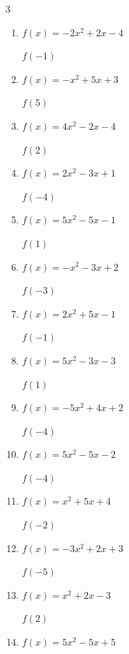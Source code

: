 \begin{multicols}{3}
\begin{enumerate}
$f(-5)$
        \phantom{$= -82$}

  \item $f(x)=-2x^{2}+2x-4$

$f(-1)$
        \phantom{$= -8$}

  \item $f(x)=-x^{2}+5x+3$

$f(5)$
        \phantom{$= 3$}

  \item $f(x)=4x^{2}-2x-4$

$f(2)$
        \phantom{$= 8$}

  \item $f(x)=2x^{2}-3x+1$

$f(-4)$
        \phantom{$= 45$}

  \item $f(x)=5x^{2}-5x-1$

$f(1)$
        \phantom{$= -1$}

  \item $f(x)=-x^{2}-3x+2$

$f(-3)$
        \phantom{$= 2$}

  \item $f(x)=2x^{2}+5x-1$

$f(-1)$
        \phantom{$= -4$}

  \item $f(x)=5x^{2}-3x-3$

$f(1)$
        \phantom{$= -1$}

  \item $f(x)=-5x^{2}+4x+2$

$f(-4)$
        \phantom{$= -94$}

\columnbreak %

  \item $f(x)=5x^{2}-5x-2$

$f(-4)$
        \phantom{$= 98$}

  \item $f(x)=x^{2}+5x+4$

$f(-2)$
        \phantom{$= -2$}

  \item $f(x)=-3x^{2}+2x+3$

$f(-5)$
        \phantom{$= -82$}

  \item $f(x)=x^{2}+2x-3$

$f(2)$
        \phantom{$= 5$}

  \item $f(x)=5x^{2}-5x+5$


\end{enumerate}
\end{multicols}
